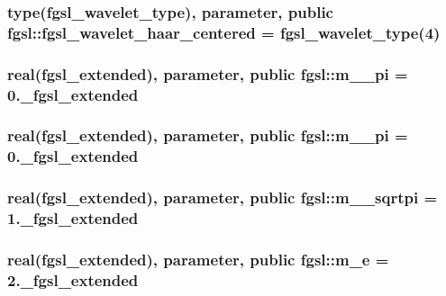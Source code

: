 \hypertarget{classfgsl_a98a440f78f036ed2b35f84992ba0db82}{
\subsubsection[{fgsl\-\_\-wavelet\-\_\-haar\-\_\-centered}]{\setlength{\rightskip}{0pt plus 5cm}type({\bf fgsl\-\_\-wavelet\-\_\-type}), parameter, public fgsl\-::fgsl\-\_\-wavelet\-\_\-haar\-\_\-centered = {\bf fgsl\-\_\-wavelet\-\_\-type}(4)}}\label{classfgsl_a98a440f78f036ed2b35f84992ba0db82}
\hypertarget{classfgsl_a10fdf50a29d35a63b13bc641ed465051}{
\subsubsection[{m\-\_\-1\-\_\-pi}]{\setlength{\rightskip}{0pt plus 5cm}real({\bf fgsl\-\_\-extended}), parameter, public fgsl\-::m\-\_\-\_\-pi = 0.\-\_\-fgsl\-\_\-extended}}\label{classfgsl_a10fdf50a29d35a63b13bc641ed465051}
\hypertarget{classfgsl_a28e530e58a51ac2bbce00674f617bbbd}{
\subsubsection[{m\-\_\-2\-\_\-pi}]{\setlength{\rightskip}{0pt plus 5cm}real({\bf fgsl\-\_\-extended}), parameter, public fgsl\-::m\-\_\-\_\-pi = 0.\-\_\-fgsl\-\_\-extended}}\label{classfgsl_a28e530e58a51ac2bbce00674f617bbbd}
\hypertarget{classfgsl_a20272585dc8f0b54e493f4717330469a}{
\subsubsection[{m\-\_\-2\-\_\-sqrtpi}]{\setlength{\rightskip}{0pt plus 5cm}real({\bf fgsl\-\_\-extended}), parameter, public fgsl\-::m\-\_\-\_\-sqrtpi = 1.\-\_\-fgsl\-\_\-extended}}\label{classfgsl_a20272585dc8f0b54e493f4717330469a}
\hypertarget{classfgsl_abd883826f3a31d832e0746f37ac56cff}{
\subsubsection[{m\-\_\-e}]{\setlength{\rightskip}{0pt plus 5cm}real({\bf fgsl\-\_\-extended}), parameter, public fgsl\-::m\-\_\-e = 2.\-\_\-fgsl\-\_\-extended}}\label{classfgsl_abd883826f3a31d832e0746f37ac56cff}
